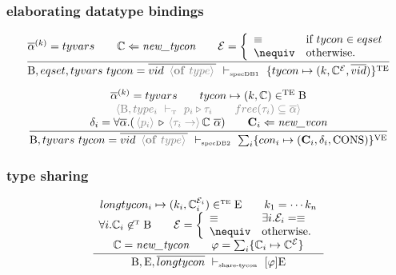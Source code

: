 \documentclass[11pt,a4paper]{article}
\newcommand{\key}[1]{\textrm{\textbf{#1}}}
\newcommand{\B}  {\textrm{B}}
\newcommand{\E}  {\textrm{E}}
\newcommand{\sT} {\textrm{\tiny T}}
\newcommand{\TE} {\textrm{TE}}
\newcommand{\sTE}{\textrm{\tiny TE}}
\newcommand{\VE} {\textrm{VE}}
\newcommand{\tycon}{\mathbb{C}}
\newcommand{\vcon} {\mathbf{C}}
\newcommand{\equality}{\mathcal{E}}
\newcommand{\eqyes}{\equiv}
\newcommand{\eqnot}{\nequiv}
\newcommand{\VKC}  {\textrm{CONS}}
\newcommand{\corenew}[1]{\textit{new\_#1}}
\newcommand{\vdashSpecDBA} {\ \vdash_{\textrm{\tiny specDB1}}\ }
\newcommand{\vdashSpecDBB} {\ \vdash_{\textrm{\tiny specDB2}}\ }
\newcommand{\vdashShareTycon}{\ \vdash_{\textrm{\tiny share-tycon}}\ }
\newcommand{\vdashT}       {\ \vdash_{\textrm{\tiny T}}\ }
\newcommand{\braced}[1]{\{#1\}}
\newcommand{\angled}[1]{\,{\color{gray}\langle#1\rangle}\,}
\newcommand{\qualtype}[2]{#1 \triangleright #2}
\begin{document}
\subsubsection {elaborating datatype bindings}
\[
\cfrac
 {\overline{\alpha}^{(k)} = tyvars      \qquad
  \tycon \Leftarrow \corenew{tycon} 	\qquad
  \equality = \left\{\begin{array}{ll}
  			  \eqyes	& \textrm{if } tycon \in eqset  	\\
			  \eqnot	& \textrm{otherwise.}				\\
  			  \end{array}\right.
 }
 {\B,eqset,tyvars\ tycon = \overline{vid\ \angled{\key{of}\ type}} \vdashSpecDBA
    \braced{tycon \mapsto (k, \tycon^\equality,\overline{vid})}^\TE }
\]

\[
\cfrac
 {\begin{array}{c}
  \overline{\alpha}^{(k)} = tyvars                 \qquad
  tycon \mapsto (k,\tycon) \in^\TE \B 	           \\
  \angled{\B,type_i \vdashT \qualtype{p_i}{\tau_i} \qquad
  free(\tau_i) \subseteq \overline{\alpha}}        \\
  \delta_i = \forall{\overline\alpha}.(
    \qualtype{\angled{p_i}}{{\angled{\tau_i \to }\tycon\ \overline\alpha}}) \qquad
  \vcon_i\Leftarrow\corenew{vcon}			       \\
  \end{array} }
 {
  \B,tyvars\ tycon = \overline{vid\ \angled{\key{of}\ type}} \vdashSpecDBB 
    \sum_i\braced{con_i \mapsto (\vcon_i,\delta_i,\VKC)}^\VE 
 }
\]

\subsubsection {type sharing}
\[
\cfrac
 {\begin{array}{c}
  longtycon_i \mapsto (k_i, \tycon_i^{\equality_i}) \in^\sTE \E \qquad
  k_1 = \cdots k_n                                              \\
  \forall i. \tycon_i \not\in^\sT \B \qquad
  \equality = \left\{\begin{array}{ll}
                \eqyes & \exists i. \equality_i = \eqyes \\
                \eqnot & \textrm{otherwise.}             \\
              \end{array}\right.                                \\
  \tycon = \corenew{tycon}  \qquad
  \varphi = \sum_i \braced{\tycon_i \mapsto \tycon^\equality}
  \end{array}}
 {\B, \E, \overline{longtycon} \vdashShareTycon [\varphi]\E}
\]
\end{document}
